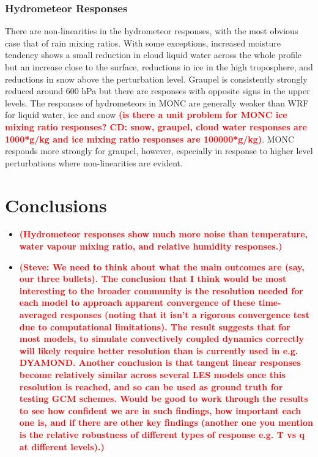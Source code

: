 \documentclass[draft]{agujournal2019}
\newcommand{\todo}[1]{\textcolor{red}{\textbf{(#1)}}}
\begin{document}
\subsubsection{Hydrometeor Responses}

There are non-linearities in the hydrometeor responses, with the most obvious
case that of rain mixing ratios. With some exceptions, increased moisture
tendency shows a small reduction in cloud liquid water across the whole profile
but an increase close to the surface, reductions in ice in the high troposphere,
and reductions in snow above the perturbation level. Graupel is consistently
strongly reduced around 600 hPa but there are responses with opposite signs in
the upper levels. The responses of hydrometeors in MONC are generally weaker
than WRF for liquid water, ice and snow \todo{is there a unit problem for MONC
ice mixing ratio responses? CD: snow, graupel, cloud water responses are
1000*g/kg and ice mixing ratio  responses are 100000*g/kg}. MONC responds more
strongly for graupel, however, especially in response to higher level
perturbations where non-linearities are evident.

\section{Conclusions}
\label{sec:conclusions}

\begin{itemize}
\item \todo{Hydrometeor responses show much more noise than temperature, water vapour mixing ratio, and relative humidity responses.}
\item \todo{Steve: We need to think about what the main outcomes are (say, our
three bullets).  The conclusion that I think would be most interesting to the
broader community is the resolution needed for each model to approach apparent
convergence of these time-averaged responses (noting that it isn’t a rigorous
convergence test due to computational limitations).  The result suggests that
for most models, to simulate convectively coupled dynamics correctly will likely
require better resolution than is currently used in e.g. DYAMOND. Another
conclusion is that tangent linear responses become relatively similar across
several LES models once this resolution is reached, and so can be used as ground
truth for testing GCM schemes.  Would be good to work through the results to see
how confident we are in such findings, how important each one is, and if there
are other key findings (another one you mention is the relative robustness of
different types of response e.g. T vs q at different levels).}
\end{itemize}
\end{document}
